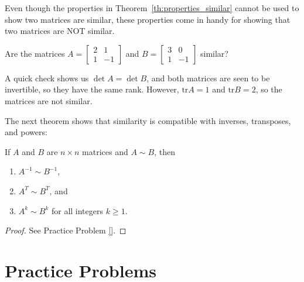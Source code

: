 \documentclass{ximera}
\begin{document}
Even though the properties in Theorem~\ref{th:properties_similar} cannot be used to show two matrices are similar, these properties come in handy for showing that two matrices are NOT similar.

\begin{example}
Are the matrices $A =
\begin{bmatrix}
2 & 1 \\
1 & -1
\end{bmatrix}$ and $B =
\begin{bmatrix}
3 & 0 \\
1 & -1
\end{bmatrix}$ similar?
\begin{explanation}
A quick check shows us $\det A = \det B$, and both matrices are seen to be invertible, so they have the same rank.  However, $\mbox{tr} A = 1$ and $\mbox{tr} B = 2$, so the matrices are not similar.
\end{explanation}
\end{example}

The next theorem shows that similarity is compatible with inverses, transposes, and powers:

\begin{theorem}\label{th:other_properties_similar}
If $A$ and $B$ are $n\times n$ matrices and $A\sim B$, then
\begin{enumerate}
\item\label{th:properties_similar_inverse} $A^{-1} \sim B^{-1}$,
\item\label{th:properties_similar_transpose} $A^T \sim B^T$, and
\item\label{th:properties_similar_powers} $A^k \sim B^k$ for all integers $k \geq 1$.
\end{enumerate}
\end{theorem}

\begin{proof}
See Practice Problem \ref{}.
\end{proof}

\section*{Practice Problems}
\end{document}
